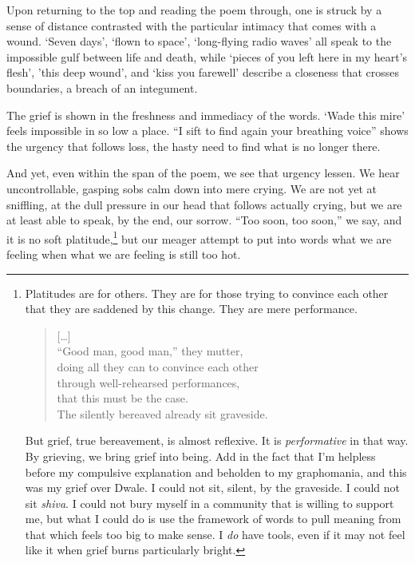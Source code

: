 Upon returning to the top and reading the poem through, one is struck by a sense of distance contrasted with the particular intimacy that comes with a wound. `Seven days', `flown to space', `long-flying radio waves' all speak to the impossible gulf between life and death, while `pieces of you left here in my heart's flesh', 'this deep wound', and `kiss you farewell' describe a closeness that crosses boundaries, a breach of an integument.

The grief is shown in the freshness and immediacy of the words. `Wade this mire' feels impossible in so low a place. ``I sift to find again your breathing voice'' shows the urgency that follows loss, the hasty need to find what is no longer there.

And yet, even within the span of the poem, we see that urgency lessen. We hear uncontrollable, gasping sobs calm down into mere crying. We are not yet at sniffling, at the dull pressure in our head that follows actually crying, but we are at least able to speak, by the end, our sorrow. ``Too soon, too soon,'' we say, and it is no soft platitude,\footnote{Platitudes are for others. They are for those trying to convince each other that they are saddened by this change. They are mere performance.
\begin{verse}
{[\ldots]} \\
``Good man, good man,'' they mutter, \\
doing all they can to convince each other \\
through well-rehearsed performances, \\
that this must be the case. \\
The silently bereaved already sit graveside.\par
\parencite{penguins}
\end{verse}\par
But grief, true bereavement, is almost reflexive. It is \emph{performative} in that way. By grieving, we bring grief into being. Add in the fact that I'm helpless before my compulsive explanation and beholden to my graphomania, and this was my grief over Dwale. I could not sit, silent, by the graveside. I could not sit \emph{shiva}. I could not bury myself in a community that is willing to support me, but what I could do is use the framework of words to pull meaning from that which feels too big to make sense. I \emph{do} have tools, even if it may not feel like it when grief burns particularly bright.} but our meager attempt to put into words what we are feeling when what we are feeling is still too hot.

